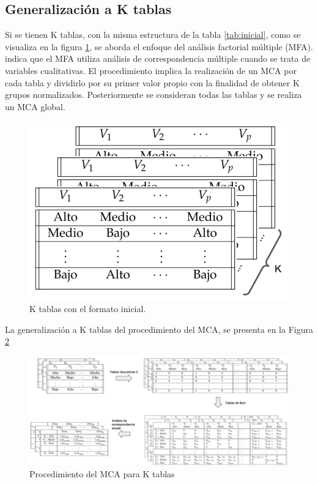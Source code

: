 \documentclass[water,article,submit,moreauthors,pdftex]{mdpi}
\begin{document}
\hypertarget{generalizaciuxf3n-a-k-tablas}{%
\subsection{Generalización a K
tablas}\label{generalizaciuxf3n-a-k-tablas}}

Si se tienen K tablas, con la misma estructura de la tabla
\ref{tab:inicial}, como se visualiza en la figura \ref{fig:ktables}, se
aborda el enfoque del análisis factorial múltiple (MFA). \citet{AFM}
indica que el MFA utiliza análisis de correspondencia múltiple cuando se
trata de variables cualitativas. El procedimiento implica la realización
de un MCA por cada tabla y dividirlo por su primer valor propio con la
finalidad de obtener K grupos normalizados. Posteriormente se consideran
todas las tablas y se realiza un MCA global.

\begin{figure}[!ht]



\begin{center}\includegraphics[width=0.4\linewidth,]{ktables} \end{center}

\caption{K tablas con el formato inicial.}

\label{fig:ktables}
\end{figure}

La generalización a K tablas del procedimiento del MCA, se presenta en
la Figura \ref{fig:MCAk}

\begin{figure}[!h]


\begin{center}\includegraphics[width=0.9\linewidth,]{ktablesMCA} \end{center}

\caption{Procedimiento del MCA para K tablas}

\label{fig:MCAk}
\end{figure}
\end{document}
